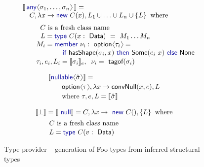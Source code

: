 \documentclass[10pt,preprint,blind,clearpagebib]{sigplanconf}
\newcommand{\langl}{\begin{picture}(4.5,7)
\put(1.1,2.5){\rotatebox{60}{\line(1,0){5.5}}}
\put(1.1,2.5){\rotatebox{300}{\line(1,0){5.5}}}
\end{picture}}
\newcommand{\rangl}{\begin{picture}(4.5,7)
\put(.9,2.5){\rotatebox{120}{\line(1,0){5.5}}}
\put(.9,2.5){\rotatebox{240}{\line(1,0){5.5}}}
\end{picture}}
\newcommand{\kvd}[1]{\textnormal{\textcolor{kvdclr}{\sffamily #1}}}
\newcommand{\ident}[1]{\textnormal{\sffamily #1}}
\newcommand{\tytagof}{\ident{tagof}}
\newcommand{\sem}[1]{\llbracket #1 \rrbracket}
\begin{document}
\begin{figure}
\begin{multicols}{2}
\noindent
\begin{equation*}
\begin{array}{l}
 \sem{\,\kvd{any}\langl\sigma_1, \ldots, \sigma_n\rangl\,} = \\
 \quad C, \lambda x\rightarrow\kvd{new}~C(x), L_1\cup\ldots\cup L_n\cup\{ L \}\;\;\textnormal{where}\\[0.6em]
 \qquad \;\;C~\textnormal{is a fresh class name} \\
 \qquad \;\,\,L = \kvd{type}~C(x:\ident{Data})~=~M_1\ldots M_n \\
 \qquad M_i = \kvd{member}~\nu_i:\ident{option}\langl\tau_i\rangl=\\
 \hspace{5.8em}  \kvd{if}~\ident{hasShape}(\sigma_i, x)~\kvd{then}~ \ident{Some}(e_i~x)~\kvd{else}~\ident{None} \\[0.1em]
 \qquad \tau_i, e_i, L_i = \sem{\sigma_i}_e,\;\; \nu_i=\tytagof{(\sigma_i)}
\end{array}
\end{equation*}
\vspace{-2em}

\begin{equation*}
\hspace{-1.3em}
\begin{array}{l}
 \sem{\kvd{nullable}\langl\hat{\sigma}\rangl} = \\[0.2em]
 \qquad \ident{option}\langl\tau\rangl, \lambda x \rightarrow \ident{convNull}(x,e), L\\[0.2em] 
 \qquad \textnormal{where}~\tau, e, L = \sem{\hat{\sigma}}
\end{array}
\end{equation*}
\vspace{-2em}

\begin{equation*}
\hspace{-1.3em}
\begin{array}{l}
 \sem{\bot} = \sem{\kvd{null}} = C, \lambda x\rightarrow \kvd{new}~C(), \{ L \} \;\;\textnormal{where}\\[0.4em]
 \qquad C~\textnormal{is a fresh class name} \\[0.1em]
 \qquad L = \kvd{type}~C(v:\ident{Data})
\end{array}
\end{equation*}
\end{multicols}

\caption{Type provider -- generation of Foo types from inferred structural types}
\label{fig:tp-generation}
\vspace{-0.5em}
\end{figure}
\end{document}
